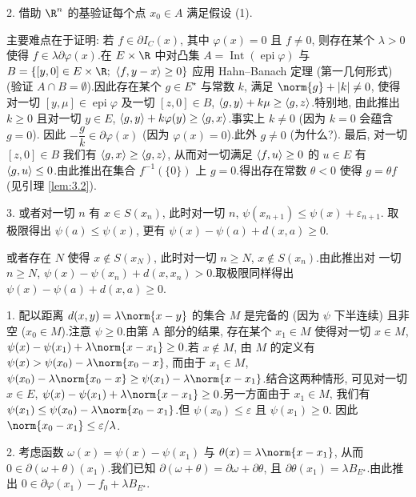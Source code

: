 2. 借助 $\R^n$ 的基验证每个点 $x_0\in A$ 满足假设 (1).


主要难点在于证明: 若 $f\in\partial I_C(x)$, 其中 $\varphi(x)=0$ 且 $f\ne0$, 则存在某个
$\lambda>0$ 使得 $f\in\lambda\partial\varphi(x)$.在 $E\times\R$ 中对凸集
$A=\operatorname{Int}(\operatorname{epi}\varphi)$ 与 $B=\{[y,0]\in E\times\R;\ \dual{f}{y-x}\ge0\}$
应用 Hahn--Banach 定理 (第一几何形式) (验证 $A\cap B=\emptyset$).因此存在某个 $g\in E^\star$
与常数 $k$, 满足 $\norm{g}+\abs{k}\ne0$, 使得对一切 $[y,\mu]\in\operatorname{epi}\varphi$
及一切 $[z,0]\in B$, $\left\langle g,y\right\rangle+k\mu\ge\left\langle g,z\right\rangle$.特别地, 由此推出 $k\ge0$ 且对一切
$y\in E$, $\left\langle g,y\right\rangle+k\varphi(y)\ge\left\langle g,x\right\rangle$.事实上 $k\ne0$ (因为 $k=0$ 会蕴含 $g=0$).
因此 $-\dfrac gk\in\partial\varphi(x)$ (因为 $\varphi(x)=0$).此外 $g\ne0$ (为什么?).
最后, 对一切 $[z,0]\in B$ 我们有 $\left\langle g,x\right\rangle\ge\left\langle g,z\right\rangle$, 从而对一切满足 $\left\langle f,u\right\rangle\ge0$
的 $u\in E$ 有 $\left\langle g,u\right\rangle\le0$.由此推出在集合 $f^{-1}(\{0\})$ 上 $g=0$.得出存在常数
$\theta<0$ 使得 $g=\theta f$ (见引理  \ref{lem:3.2}).



3. 或者对一切 $n$ 有 $x\in S(x_n)$, 此时对一切 $n$, $\psi(x_{n+1})\le\psi(x)+\varepsilon_{n+1}$.
取极限得出 $\psi(a)\le\psi(x)$, 更有 $\psi(x)-\psi(a)+d(x,a)\ge0$.

或者存在 $N$ 使得 $x\notin S(x_N)$, 此时对一切 $n\ge N$, $x\notin S(x_n)$.由此推出对
一切 $n\ge N$, $\psi(x)-\psi(x_n)+d(x,x_n)>0$.取极限同样得出 $\psi(x)-\psi(a)+d(x,a)\ge0$.


1. 配以距离 $d(x,y)=\lambda\norm{x-y}$ 的集合 $M$ 是完备的 (因为 $\psi$ 下半连续) 且非空
($x_0\in M$).注意 $\psi\ge0$.由第 A 部分的结果, 存在某个 $x_1\in M$ 使得对一切 $x\in M$,
$\psi(x)-\psi(x_1)+\lambda\norm{x-x_1}\ge0$.若 $x\notin M$, 由 $M$ 的定义有
$\psi(x)>\psi(x_0)-\lambda\norm{x_0-x}$, 而由于 $x_1\in M$,
$\psi(x_0)-\lambda\norm{x_0-x}\ge\psi(x_1)-\lambda\norm{x-x_1}$.结合这两种情形, 可见对一切
$x\in E$, $\psi(x)-\psi(x_1)+\lambda\norm{x-x_1}\ge0$.另一方面由于 $x_1\in M$, 我们有
$\psi(x_1)\le\psi(x_0)-\lambda\norm{x_0-x_1}$.但 $\psi(x_0)\le\varepsilon$ 且 $\psi(x_1)\ge0$.
因此 $\norm{x_0-x_1}\le\varepsilon/\lambda$.

2. 考虑函数 $\omega(x)=\psi(x)-\psi(x_1)$ 与 $\theta(x)=\lambda\norm{x-x_1}$, 从而
$0\in\partial(\omega+\theta)(x_1)$.我们已知 $\partial(\omega+\theta)=\partial\omega+\partial\theta$,
且 $\partial\theta(x_1)=\lambda B_{E^\star}$.由此推出 $0\in\partial\varphi(x_1)-f_0+\lambda B_{E^\star}$.

